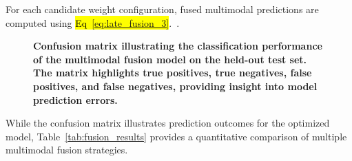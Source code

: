 \documentclass[10pt,letterpaper]{article}
\begin{document}
                                                                                                                          For each candidate weight configuration, fused multimodal predictions are computed using \hl{Eq~\ref{eq:late_fusion_3}}.~\cite{ref59}. 

                                                                                                                          \begin{figure}[!ht]
                                                                                                                          \caption{\textbf{Confusion matrix illustrating the classification performance of the multimodal fusion model on the held-out test set.
                                                                                                                          The matrix highlights true positives, true negatives, false positives, and false negatives, providing insight into model prediction errors.}}
                                                                                                                          \label{fig:confusion_matrix}
                                                                                                                          \end{figure}

                                                                                                                          While the confusion matrix illustrates prediction outcomes for the optimized model, Table~\ref{tab:fusion_results} provides a quantitative comparison of multiple multimodal fusion strategies.
\end{document}
